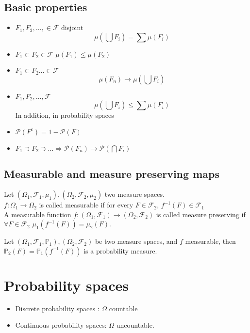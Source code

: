 \documentclass[../main.tex]{subfiles}
\begin{document}
\subsection{Basic properties}
\begin{itemize}
\item $F_1,F_2, \ldots, \in \mathcal{F}$ disjoint
	\[ 
		\mu( \bigcup F_i) = \sum \mu( F_i) 
	\]
	
\item $F_1 \subset F_2 \in \mathcal{F}$ $\mu( F_1) \leq \mu( F_2) $ 
\item $F_1 \subset F_2 \ldots \in \mathcal{F}$ 
	\[ 
		\mu( F_n) \to \mu( \bigcup F_i) 
	\]

\item $F_1, F_2, \ldots, \mathcal{F}$
	\[ 
		\mu ( \bigcup F_i) \leq \sum \mu( F_i) 
	\]
In addition, in probability spaces
\item $\mathcal{P}( F^{c}) = 1- \mathcal{P}( F) $ 
\item $F_1 \supset F_2 \supset \ldots \Rightarrow \mathcal{P}( F_n) \to \mathcal{P}( \bigcap F_i) $ 


\end{itemize}
\subsection{Measurable and measure preserving maps}
\begin{defn}
	Let $( \Omega_1, \mathcal{F}_1, \mu_1) , ( \Omega_2, \mathcal{F}_2, \mu_2) $ two measure spaces.\\
	$f: \Omega_1 \to \Omega_2$ is called measurable if for every $F \in \mathcal{F}_2$, $f^{-1}( F) \in \mathcal{F}_1$ \\
	A measurable function $f: ( \Omega_1, \mathcal{F}_1) \to ( \Omega_2, \mathcal{F}_2) $ is called measure preserving if $\forall F \in \mathcal{F}_2$ $\mu_1 ( f^{-1}( F) ) = \mu_2( F) $.
\end{defn}
\begin{lemma}
	Let $( \Omega_1, \mathcal{F}_1, \mathbb{P}_1), ( \Omega_2, \mathcal{F}_2)  $ be two measure spaces, and $f$ measurable, then $\mathbb{P}_2( F) = \mathbb{P}_1( f^{-1}( F) ) $ is a probability measure.

\end{lemma}
\section{Probability spaces}
\begin{itemize}
\item Discrete probability spaces : $\Omega$ countable
\item Continuous probability spaces: $\Omega$ uncountable.
\end{itemize}
\end{document}
